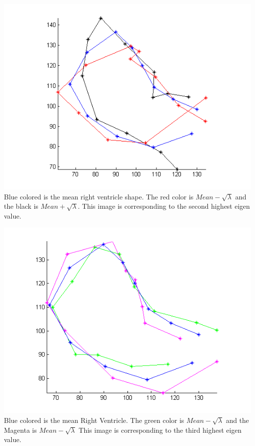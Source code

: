 \documentclass[paper=a4, fontsize=11pt,twoside]{scrartcl}	%
\begin{document}
\includegraphics{HeartMode2.png}
Blue colored is the mean right ventricle shape. The red color is $Mean - \sqrt{\lambda}$ and the black is $Mean + \sqrt{\lambda}$. This image is corresponding to the second highest eigen value.

\includegraphics{HeartMode3.png}
Blue colored is the mean Right Ventricle. The green color is $Mean - \sqrt{\lambda}$ and the Magenta is $Mean - \sqrt{\lambda}$ This image is corresponding to the third highest eigen value.
\end{document}
